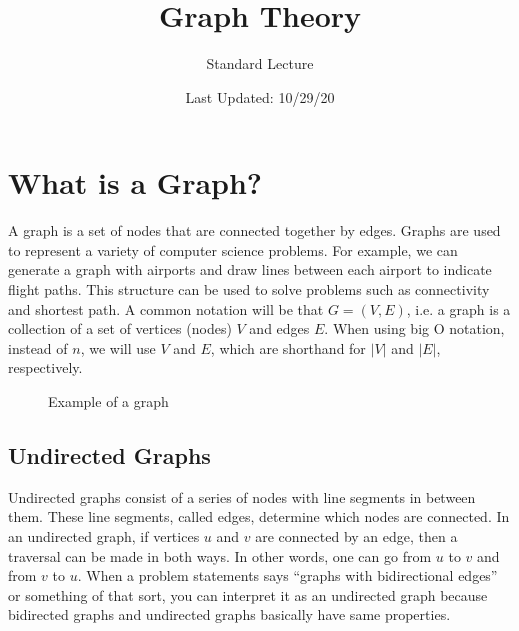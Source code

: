 \documentclass{article}
\title{Graph Theory}
\author{Standard Lecture}
\date{Last Updated: 10/29/20}
\begin{document}
\maketitle

\section{What is a Graph?}
A graph is a set of nodes that are connected together by edges.
Graphs are used to represent a variety of computer science problems.
For example, we can generate a graph with airports and draw lines between each
airport to indicate flight paths. This structure can be used to solve problems
such as connectivity and shortest path.
A common notation will be that \( G = (V, E) \), i.e. a graph is a collection
of a set of vertices (nodes) \( V \) and edges \( E \).
When using big O notation, instead of \( n \), we will use \( V \) and \( E \),
which are shorthand for \( \lvert V \rvert \) and
\( \lvert E \rvert \), respectively.  

\begin{figure} [H]
    \begin{center}
    \end{center}
    \caption{Example of a graph}
\end{figure}

\subsection{Undirected Graphs}
Undirected graphs consist of a series of nodes with line segments in between them.
These line segments, called edges, determine which nodes are connected.
In an undirected graph, if vertices \( u \) and \( v \) are connected by an edge,
then a traversal can be made in both ways.
In other words, one can go from \( u \) to \( v \) and from \( v \) to \( u \).
When a problem statements says ``graphs with bidirectional edges'' or something
of that sort, you can interpret it as an undirected graph because bidirected
graphs and undirected graphs basically have same properties.
\end{document}
